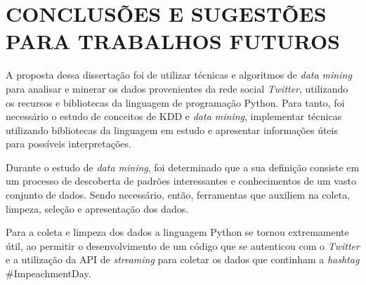 \chapter{CONCLUSÕES E SUGESTÕES PARA TRABALHOS FUTUROS}\label{ch:conclusao}

A proposta dessa dissertação foi de utilizar técnicas e algoritmos de \textit{data mining} para analisar e minerar os dados provenientes da rede social \textit{Twitter}, utilizando os recursos e bibliotecas da linguagem de programação Python. Para tanto, foi necessário o estudo de conceitos de KDD e \textit{data mining}, implementar técnicas utilizando bibliotecas da linguagem em estudo e apresentar informações úteis para possíveis interpretações.

Durante o estudo de \textit{data mining}, foi determinado que a sua definição consiste em um processo de descoberta de padrões interessantes e conhecimentos de um vasto conjunto de dados. Sendo necessário, então, ferramentas que auxiliem na coleta, limpeza, seleção e apresentação dos dados.

Para a coleta e limpeza dos dados a linguagem Python se tornou extremamente útil, ao permitir o desenvolvimento de um código que se autenticou com o \textit{Twitter} e a utilização da API de \textit{streaming} para coletar os dados que continham a \textit{hashtag} \#ImpeachmentDay.




%
%
%
%
%
